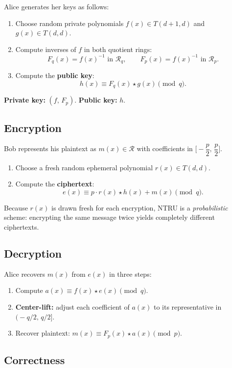 \documentclass[12pt, a4paper]{article}
\theoremstyle{definition}
\theoremstyle{plain}
\newcommand{\R}{\mathcal{R}}
\begin{document}
Alice generates her keys as follows:
\begin{enumerate}
    \item Choose random private polynomials $f(x) \in T(d+1, d)$ and
          $g(x) \in T(d, d)$.
    \item Compute inverses of $f$ in both quotient rings:
          \[
              F_q(x) = f(x)^{-1} \text{ in } \R_q, \qquad
              F_p(x) = f(x)^{-1} \text{ in } \R_p.
          \]
    \item Compute the \textbf{public key}:
          \[
              h(x) \equiv F_q(x) \star g(x) \pmod{q}.
          \]
\end{enumerate}
\textbf{Private key:} $(f,\, F_p)$. \quad \textbf{Public key:} $h$.

\subsection{Encryption}

Bob represents his plaintext as $m(x) \in \R$ with coefficients in
$\bigl[-\dfrac{p}{2},\, \dfrac{p}{2}\bigr]$.
\begin{enumerate}
    \item Choose a fresh random ephemeral polynomial $r(x) \in T(d, d)$.
    \item Compute the \textbf{ciphertext}:
          \[
              e(x) \equiv p \cdot r(x) \star h(x) + m(x) \pmod{q}.
          \]
\end{enumerate}

Because $r(x)$ is drawn fresh for each encryption, NTRU is a \textit{probabilistic} scheme: encrypting the same message twice yields completely different ciphertexts.

\subsection{Decryption}

Alice recovers $m(x)$ from $e(x)$ in three steps:
\begin{enumerate}
    \item Compute $a(x) \equiv f(x) \star e(x) \pmod{q}$.
    \item \textbf{Center-lift:} adjust each coefficient of $a(x)$ to its
          representative in $\bigl(-q/2,\, q/2\bigr]$.
    \item Recover plaintext: $m(x) \equiv F_p(x) \star a(x) \pmod{p}$.
\end{enumerate}

\subsection{Correctness}\label{sec:correctness}
\end{document}
